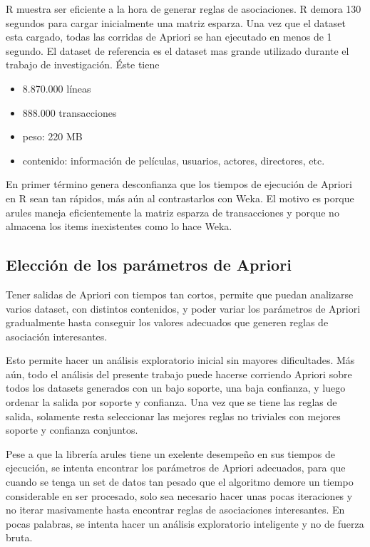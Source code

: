 \documentclass[journal]{IEEEtran}
\begin{document}
R muestra ser eficiente a la hora de generar reglas de asociaciones. R demora 130 segundos para
cargar inicialmente una matriz esparza. Una vez que el dataset esta cargado, todas las
corridas de Apriori se han ejecutado en menos de 1 segundo. El dataset de referencia es el
dataset mas grande utilizado durante el trabajo de investigación. Éste tiene
\begin{itemize}
	\item 8.870.000 líneas
	\item 888.000 transacciones
	\item peso: 220 MB
	\item contenido: información de películas, usuarios, actores, directores, etc.
\end{itemize}

En primer término genera desconfianza  que los tiempos de ejecución de Apriori en R 
sean tan rápidos,
más aún al contrastarlos con Weka. 
El motivo es porque arules maneja eficientemente la matriz esparza de transacciones y
porque no almacena los items inexistentes como lo hace Weka.


\subsection{Elección de los parámetros de Apriori}

Tener salidas de Apriori con tiempos tan cortos, permite que puedan analizarse 
varios dataset, con distintos contenidos, y poder variar los parámetros de Apriori gradualmente
hasta conseguir los valores adecuados que generen reglas de asociación interesantes.

Esto permite hacer un análisis exploratorio inicial sin mayores dificultades. Más aún, todo el 
análisis del presente trabajo puede hacerse corriendo Apriori sobre todos los datasets generados
con un bajo soporte, una baja confianza, y luego ordenar la salida por soporte y confianza.
Una vez que se tiene las reglas de salida, solamente resta seleccionar las mejores reglas 
no triviales con mejores soporte y confianza conjuntos.

Pese a que la librería arules tiene un exelente desempeño en sus tiempos de ejecución, se intenta
encontrar los parámetros de Apriori adecuados, para que cuando se tenga un set de datos tan pesado
que el algoritmo demore un tiempo considerable en ser procesado, 
solo sea necesario hacer unas pocas iteraciones y
no iterar masivamente hasta encontrar reglas de asociaciones interesantes. En pocas palabras,
se intenta hacer un análisis exploratorio inteligente y no de fuerza bruta.
\end{document}
